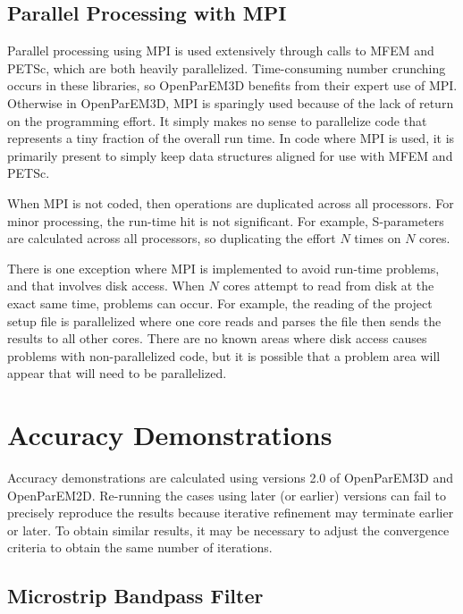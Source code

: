 \documentclass[titlepage]{article}
\renewcommand\_{\textunderscore\linebreak[1]}
\begin{document}
\subsection{Parallel Processing with MPI}

Parallel processing using MPI is used extensively through calls to MFEM and PETSc, which are both heavily parallelized.  Time-consuming number crunching occurs in these libraries, so OpenParEM3D benefits from their expert use of MPI.  Otherwise in OpenParEM3D, MPI is sparingly used because of the lack of return on the programming effort.  It simply makes no sense to parallelize code that represents a tiny fraction of the overall run time. In code where MPI is used, it is primarily present to simply keep data structures aligned for use with MFEM and PETSc.

When MPI is not coded, then operations are duplicated across all processors.  For minor processing, the run-time hit is not significant.  For example, S-parameters are calculated across all processors, so duplicating the effort $N$ times on $N$ cores.

There is one exception where MPI is implemented to avoid run-time problems, and that involves disk access.  When $N$ cores attempt to read from disk at the exact same time, problems can occur.  For example, the reading of the project setup file is parallelized where one core reads and parses the file then sends the results to all other cores.  There are no known areas where disk access causes problems with non-parallelized code, but it is possible that a problem area will appear that will need to be parallelized.

\section{Accuracy Demonstrations}
\label{sec:accuracy}

Accuracy demonstrations are calculated using versions 2.0 of OpenParEM3D and OpenParEM2D.  Re-running the cases using later (or earlier) versions can fail to precisely reproduce the results because iterative refinement may terminate earlier or later.  To obtain similar results, it may be necessary to adjust the convergence criteria to obtain the same number of iterations.

\subsection{Microstrip Bandpass Filter}
\end{document}
